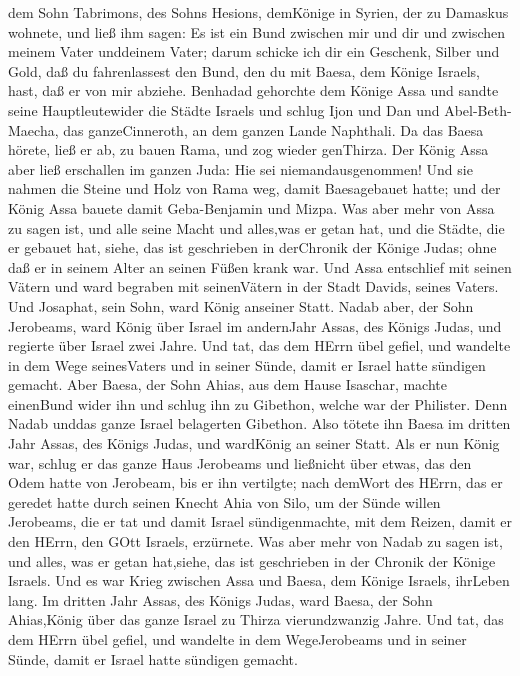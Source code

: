dem Sohn Tabrimons, des Sohns Hesions, demKönige in Syrien, der zu
Damaskus wohnete, und ließ ihm sagen:  Es ist ein Bund
zwischen mir und dir und zwischen meinem Vater unddeinem Vater; darum
schicke ich dir ein Geschenk, Silber und Gold, daß du fahrenlassest den
Bund, den du mit Baesa, dem Könige Israels, hast, daß er von mir
abziehe.  Benhadad gehorchte dem Könige Assa und sandte
seine Hauptleutewider die Städte Israels und schlug Ijon und Dan und
Abel-Beth-Maecha, das ganzeCinneroth, an dem ganzen Lande Naphthali.
 Da das Baesa hörete, ließ er ab, zu bauen Rama, und zog
wieder genThirza.  Der König Assa aber ließ erschallen im
ganzen Juda: Hie sei niemandausgenommen! Und sie nahmen die Steine und
Holz von Rama weg, damit Baesagebauet hatte; und der König Assa bauete
damit Geba-Benjamin und Mizpa.  Was aber mehr von Assa zu
sagen ist, und alle seine Macht und alles,was er getan hat, und die
Städte, die er gebauet hat, siehe, das ist geschrieben in derChronik der
Könige Judas; ohne daß er in seinem Alter an seinen Füßen krank war.
 Und Assa entschlief mit seinen Vätern und ward begraben
mit seinenVätern in der Stadt Davids, seines Vaters. Und Josaphat, sein
Sohn, ward König anseiner Statt.  Nadab aber, der Sohn
Jerobeams, ward König über Israel im andernJahr Assas, des Königs Judas,
und regierte über Israel zwei Jahre.  Und tat, das dem
HErrn übel gefiel, und wandelte in dem Wege seinesVaters und in seiner
Sünde, damit er Israel hatte sündigen gemacht.  Aber Baesa,
der Sohn Ahias, aus dem Hause Isaschar, machte einenBund wider ihn und
schlug ihn zu Gibethon, welche war der Philister. Denn Nadab unddas
ganze Israel belagerten Gibethon.  Also tötete ihn Baesa im
dritten Jahr Assas, des Königs Judas, und wardKönig an seiner Statt.
 Als er nun König war, schlug er das ganze Haus Jerobeams
und ließnicht über etwas, das den Odem hatte von Jerobeam, bis er ihn
vertilgte; nach demWort des HErrn, das er geredet hatte durch seinen
Knecht Ahia von Silo,  um der Sünde willen Jerobeams, die
er tat und damit Israel sündigenmachte, mit dem Reizen, damit er den
HErrn, den GOtt Israels, erzürnete.  Was aber mehr von
Nadab zu sagen ist, und alles, was er getan hat,siehe, das ist
geschrieben in der Chronik der Könige Israels.  Und es war
Krieg zwischen Assa und Baesa, dem Könige Israels, ihrLeben lang.
 Im dritten Jahr Assas, des Königs Judas, ward Baesa, der
Sohn Ahias,König über das ganze Israel zu Thirza vierundzwanzig Jahre.
 Und tat, das dem HErrn übel gefiel, und wandelte in dem
WegeJerobeams und in seiner Sünde, damit er Israel hatte sündigen
gemacht.

